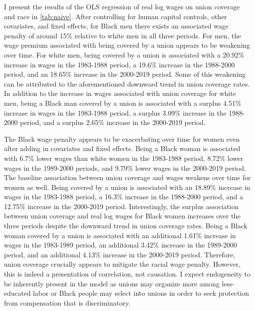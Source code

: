 \documentclass[11pt]{article}
\begin{document}
I present the results of the OLS regression of real log wages on union coverage and race in \autoref{tab:naive}. After controlling for human capital controls, other covariates, and fixed effects, for Black men there exists an associated wage penalty of around 15\% relative to white men in all three periods. For men, the wage premium associated with being covered by a union appears to be weakening over time. For white men, being covered by a union is associated with a 20.92\% increase in wages in the 1983-1988 period, a 19.6\% increase in the 1988-2000 period, and an 18.65\% increase in the 2000-2019 period. Some of this weakening can be attributed to the aforementioned downward trend in union coverage rates. In addition to the increase in wages associated with union coverage for white men, being a Black man covered by a union is associated with a surplus 4.51\% increase in wages in the 1983-1988 period, a surplus 3.09\% increase in the 1988-2000 period, and a surplus 2.65\% increase in the 2000-2019 period. 

The Black wage penalty appears to be exacerbating over time for women even after adding in covariates and fixed effects. Being a Black woman is associated with 6.7\% lower wages than white women in the 1983-1988 period, 8.72\% lower wages in the 1989-2000 periods, and 9.79\% lower wages in the 2000-2019 period. The baseline association between union coverage and wages weakens over time for women as well. Being covered by a union is associated with an 18.89\% increase in wages in the 1983-1988 period, a 16.3\% increase in the 1988-2000 period, and a 12.75\% increase in the 2000-2019 period. Interestingly, the surplus association between union coverage and real log wages for Black women increases over the three periods despite the downward trend in union coverage rates. Being a Black woman covered by a union is associated with an additional 1.61\% increase in wages in the 1983-1989 period, an additional 3.42\% increase in the 1989-2000 period, and an additional 4.13\% increase in the 2000-2019 period. Therefore, union coverage crucially appears to mitigate the racial wage penalty. However, this is indeed a presentation of correlation, not causation. I expect endogeneity to be inherently present in the model as unions may organize more among less-educated labor or Black people may select into unions in order to seek protection from compensation that is discriminatory.
\end{document}
